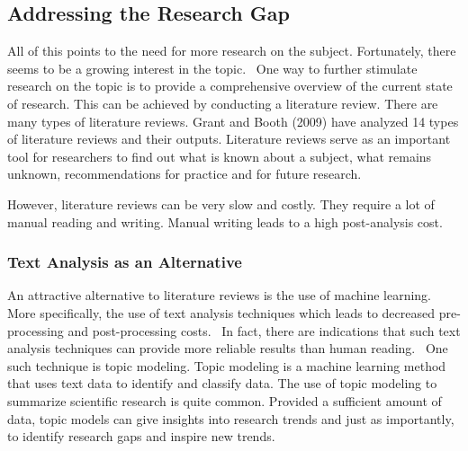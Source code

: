 \subsection*{Addressing the Research Gap}

All of this points to the need for more research on the subject. Fortunately, there seems to be a growing interest in the topic.~\citep{horesearch} One way to further stimulate research on the topic is to provide a comprehensive overview of the current state of research. This can be achieved by conducting a literature review. There are many types of literature reviews. Grant and Booth (2009) have analyzed 14 types of literature reviews and their outputs. Literature reviews serve as an important tool for researchers to find out what is known about a subject, what remains unknown, recommendations for practice and for future research.~\citep{grant2009typology}

However, literature reviews can be very slow and costly. They require a lot of manual reading and writing. Manual writing leads to a high post-analysis cost.~\citep{quinn2010analyze}

\subsubsection*{Text Analysis as an Alternative}

An attractive alternative to literature reviews is the use of machine learning. More specifically, the use of text analysis techniques which leads to decreased pre-processing and post-processing costs.~\citep{quinn2010analyze} In fact, there are indications that such text analysis techniques can provide more reliable results than human reading.~\citep{king2003automated}\citep{quinn2010analyze} One such technique is topic modeling. Topic modeling is a machine learning method that uses text data to identify and classify data. The use of topic modeling to summarize scientific research is quite common. Provided a sufficient amount of data, topic models can give insights into research trends and just as importantly, to identify research gaps and inspire new trends.~\citep{luiz2019trait}

